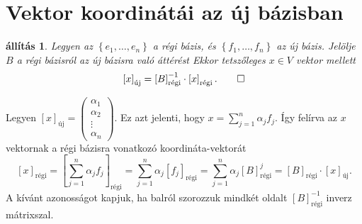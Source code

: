 \documentclass[9pt, a4paper, showtrims]{memoir}
\makeatletter
\renewenvironment{proof}[1][\proofname]
    {\par\pushQED{\qed}%
    \normalfont \topsep6\p@\@plus6\p@\relax
    \trivlist
    \item[\hskip\labelsep
        \itshape
    #1\@addpunct{:}]\ignorespaces}
    {\popQED\endtrivlist\@endpefalse}
\theoremstyle{plain}
\newtheorem{proposition}{állítás}[chapter]
\theoremstyle{remark}
\theoremstyle{definition}
\newcommand{\uj}{\text{új}}
\newcommand{\rgi}{\text{régi}}
\makeatother
\begin{document}
\section{Vektor koordinátái az új bázisban}
\begin{proposition}
	Legyen az $\left\{ e_1,\ldots,e_n \right\}$ a régi bázis,
	és $\left\{ f_1,\ldots,f_n \right\}$ az új bázis.
	Jelölje $B$ a régi bázisról az új bázisra való áttérést
	Ekkor tetszőleges $x\in V$ vektor mellett
	\[
		\left[ x \right]_\uj
		=
		\left[ B \right]_\rgi^{-1}
		\cdot
		\left[ x \right]_\rgi.\qedhere
	\]
\end{proposition}
\begin{proof}
	Legyen
	$
		\left[ x \right]_\uj
		=
		\begin{pmatrix}
			\alpha_1 \\ \alpha_2 \\ \vdots \\ \alpha_n
		\end{pmatrix}.
	$
	Ez azt jelenti, hogy $x=\sum_{j=1}^n\alpha_jf_j$.
	Így felírva az $x$ vektornak a régi bázisra vonatkozó koordináta-vektorát
	\[
		\left[ x \right]_\rgi
		=\left[ \sum_{j=1}^n\alpha_jf_j \right]_\rgi
		=\sum_{j=1}^n\alpha_j\left[ f_j \right]_\rgi
		=\sum_{j=1}^n\alpha_j\left[ B \right]_\rgi^j
		=\left[ B \right]_\rgi\cdot \left[ x \right]_\uj.
	\]
	A kívánt azonosságot kapjuk,
	ha balról szorozzuk mindkét oldalt $\left[ B \right]^{-1}_\rgi$ inverz mátrixszal.
\end{proof}
\end{document}
